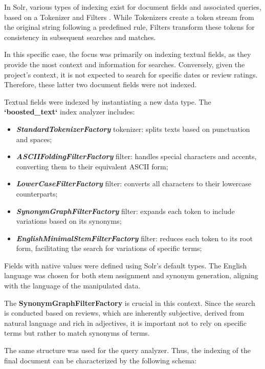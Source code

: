 \documentclass[sigconf]{acmart}
\begin{document}
In Solr, various types of indexing exist for document fields and associated queries, based on a Tokenizer \cite{Solr_Tokenizers} and Filters \cite{Solr_Filters}. While Tokenizers create a token stream from the original string following a predefined rule, Filters transform these tokens for consistency in subsequent searches and matches.
    
In this specific case, the focus was primarily on indexing textual fields, as they provide the most context and information for searches. Conversely, given the project's context, it is not expected to search for specific dates or review ratings. Therefore, these latter two document fields were not indexed.

Textual fields were indexed by instantiating a new data type. The \textbf{`boosted\_text`} index analyzer includes:

\begin{itemize}
    \item \textbf{\textit{StandardTokenizerFactory}} tokenizer: splits texts based on punctuation and spaces; 
    \item \textbf{\textit{ASCIIFoldingFilterFactory}} filter: handles special characters and accents, converting them to their equivalent ASCII form;
    \item \textbf{\textit{LowerCaseFilterFactory}} filter: converts all characters to their lowercase counterparts;
    \item \textbf{\textit{SynonymGraphFilterFactory}} filter: expands each token to include variations based on its synonyms;
    \item \textbf{\textit{EnglishMinimalStemFilterFactory}} filter: reduces each token to its root form, facilitating the search for variations of specific terms;
\end{itemize}

Fields with native values were defined using Solr's default types. The English language was chosen for both stem assignment and synonym generation, aligning with the language of the manipulated data.

The \textbf{SynonymGraphFilterFactory} is crucial in this context. Since the search is conducted based on reviews, which are inherently subjective, derived from natural language and rich in adjectives, it is important not to rely on specific terms but rather to match synonyms of terms.

The same structure was used for the query analyzer. Thus, the indexing of the final document can be characterized by the following schema:
\end{document}

